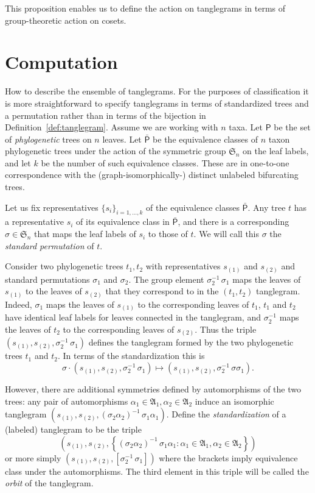 \documentclass{amsart}
\newcommand{\fS}{\mathfrak S}
\newcommand{\aut}{\mathfrak A}
\newcommand{\ptree}{\mathsf{P}}
\newcommand{\ptequiv}{\bar{\ptree}}  %
\begin{document}
This proposition enables us to define the action on tanglegrams in terms of group-theoretic action on cosets.


\section{Computation}
How to describe the ensemble of tanglegrams.
For the purposes of classification it is more straightforward to specify tanglegrams in terms of standardized trees and a permutation rather than in terms of the bijection in Definition~\ref{def:tanglegram}.
Assume we are working with $n$ taxa.
Let $\ptree$ be the set of \emph{phylogenetic} trees on $n$ leaves.
Let $\ptequiv$ be the equivalence classes of $n$ taxon phylogenetic trees under the action of the symmetric group $\fS_n$ on the leaf labels, and let $k$ be the number of such equivalence classes.
These are in one-to-one correspondence with the (graph-isomorphically-) distinct unlabeled bifurcating trees.

Let us fix representatives $\{s_i\}_{i=1,\ldots,k}$ of the equivalence classes $\ptequiv$.
Any tree $t$ has a representative $s_i$ of its equivalence class in $\ptequiv$, and there is a corresponding $\sigma \in \fS_n$ that maps the leaf labels of $s_i$ to those of $t$.
We will call this $\sigma$ the \emph{standard permutation} of $t$.

Consider two phylogenetic trees $t_1, t_2$ with representatives $s_{(1)}$ and $s_{(2)}$ and standard permutations $\sigma_1$ and $\sigma_2$.
The group element $\sigma_2^{-1} \, \sigma_1$ maps the leaves of $s_{(1)}$ to the leaves of $s_{(2)}$ that they correspond to in the $(t_1, t_2)$ tanglegram.
Indeed, $\sigma_1$ maps the leaves of $s_{(1)}$ to the corresponding leaves of $t_1$, $t_1$ and $t_2$ have identical leaf labels for leaves connected in the tanglegram, and $\sigma_2^{-1}$ maps the leaves of $t_2$ to the corresponding leaves of $s_{(2)}$.
Thus the triple $(s_{(1)}, s_{(2)}, \sigma_2^{-1} \, \sigma_1)$ defines the tanglegram formed by the two phylogenetic trees $t_1$ and $t_2$.
In terms of the standardization this is
\[
\sigma \cdot (s_{(1)}, s_{(2)}, \sigma_2^{-1} \, \sigma_1) \mapsto (s_{(1)}, s_{(2)}, \sigma_2^{-1} \, \sigma \sigma_1).
\]



However, there are additional symmetries defined by automorphisms of the two trees: any pair of automorphisms $\alpha_1 \in \aut_1, \alpha_2 \in \aut_2$ induce an isomorphic tanglegram $(s_{(1)}, s_{(2)}, \left(\sigma_2 \alpha_2 \right)^{-1} \, \sigma_1 \alpha_1)$.
Define the \emph{standardization} of a (labeled) tanglegram to be the triple
\begin{equation}
\label{eq:orbit}
\left(s_{(1)}, s_{(2)}, \left\{(\sigma_2 \alpha_2)^{-1} \, \sigma_1 \alpha_1 : \alpha_1 \in \aut_1, \alpha_2 \in \aut_2  \right\}\right)
\end{equation}
or more simply $(s_{(1)}, s_{(2)}, [\sigma_2^{-1} \, \sigma_1])$ where the brackets imply equivalence class under the automorphisms.
The third element in this triple will be called the \emph{orbit} of the tanglegram.
\end{document}
